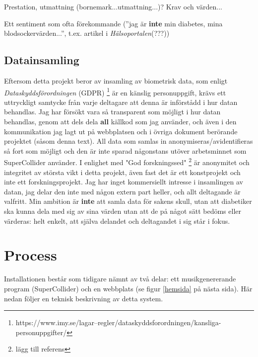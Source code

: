 \documentclass[11pt, twoside, a4paper]{article}
\begin{document}
\begin{multicols}{2}
Prestation, utmattning (bornemark...utmattning...)? Krav och värden... 

Ett sentiment som ofta förekommande (''jag är \textbf{inte} min diabetes, mina blodsockervärden...'', t.ex. artikel i \emph{Hälsoportalen}(???))

\subsection*{Datainsamling}
Eftersom detta projekt beror av insamling av biometrisk data, som enligt \emph{Dataskyddsförordningen} (GDPR) \footnote{https://www.imy.se/lagar--regler/dataskyddsforordningen/kansliga-personuppgifter/} är en känslig personuppgift, krävs ett uttryckligt samtycke från varje deltagare att denna är införstådd i hur datan behandlas. Jag har försökt vara så transparent som möjligt i hur datan behandlas, genom att dels dela \textbf{all} källkod som jag använder, och även i den kommunikation jag lagt ut på webbplatsen och i övriga dokument berörande projektet (såsom denna text). All data som samlas in anonymiseras/avidentifieras så fort som möjligt och den är inte sparad någonstans utöver arbetsminnet som SuperCollider använder. I enlighet med "God forskningssed" \footnote{lägg till referens} är anonymitet och integritet av största vikt i detta projekt, även fast det är ett konstprojekt och inte ett forskningsprojekt. Jag har inget kommersiellt intresse i insamlingen av datan, jag delar den inte med någon extern part heller, och allt deltagande är valfritt. Min ambition är \textbf{inte} att samla data för sakens skull, utan att diabetiker ska kunna dela med sig av sina värden utan att de på något sätt bedöms eller värderas: helt enkelt, att själva delandet och deltagandet i sig står i fokus. 

\section*{Process}
Installationen består som tidigare nämnt av två delar: ett musikgenererande program (SuperCollider) och en webbplats (se figur \ref{hemsida} på nästa sida). Här nedan följer en teknisk beskrivning av detta system.



\end{multicols}
\end{document}
